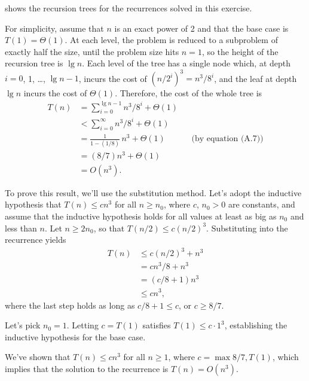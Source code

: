  shows the recursion trees for the recurrences solved in this exercise.
\vspace*{2\baselineskip}

\subexercise
For simplicity, assume that $n$ is an exact power of 2 and that the base case is $T(1)=\Theta(1)$.
At each level, the problem is reduced to a subproblem of exactly half the size, until the problem size hits $n=1$, so the height of the recursion tree is $\lg n$.
Each level of the tree has a single node which, at depth $i=0$, 1, \dots, $\lg n-1$, incurs the cost of $(n/2^i)^3=n^3\!/8^i$, and the leaf at depth $\lg n$ incurs the cost of $\Theta(1)$.
Therefore, the cost of the whole tree is
\begin{align*}
    T(n) &= \sum_{i=0}^{\lg n-1}n^3\!/8^i+\Theta(1) \\
    &< \sum_{i=0}^\infty n^3\!/8^i+\Theta(1) \\
    &= \frac{1}{1-(1/8)}\,n^3+\Theta(1) && \text{(by equation (A.7))} \\[1mm]
    &= (8/7)n^3+\Theta(1) \\
    &= O(n^3).
\end{align*}

To prove this result, we'll use the substitution method.
Let's adopt the inductive hypothesis that $T(n)\le cn^3$ for all $n\ge n_0$, where $c$, $n_0>0$ are constants, and assume that the inductive hypothesis holds for all values at least as big as $n_0$ and less than $n$.
Let $n\ge2n_0$, so that $T(n/2)\le c(n/2)^3$.
Substituting into the recurrence yields
\begin{align*}
    T(n) &\le c(n/2)^3+n^3 \\
    &= cn^3\!/8+n^3 \\
    &= (c/8+1)n^3 \\
    &\le cn^3,
\end{align*}
where the last step holds as long as $c/8+1\le c$, or $c\ge8/7$.

Let's pick $n_0=1$.
Letting $c=T(1)$ satisfies $T(1)\le c\cdot1^3$, establishing the inductive hypothesis for the base case.

We've shown that $T(n)\le cn^3$ for all $n\ge1$, where $c=\max{8/7,T(1)}$, which implies that the solution to the recurrence is $T(n)=O(n^3)$.

